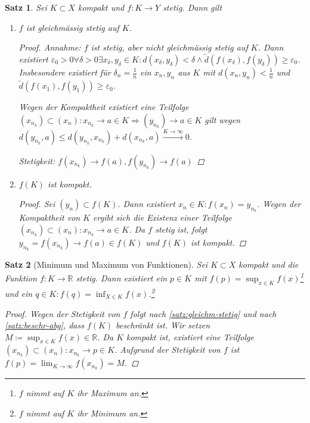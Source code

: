 \documentclass[ngerman,titlepage,twoside, parskip=half*]{scrreprt}
\newcommand*{\R}{\mathbb{R}}
\theoremstyle{break}
\newtheorem{theorem}{Satz}[section]
\theoremstyle{nonumberbreak}
\newtheorem{proof}{Beweis:}
\begin{document}
\begin{theorem}\label{satz:gleichm-stetig}
  Sei $K\subset X$ kompakt und $f\colon K\rightarrow Y$ stetig. Dann gilt
  \begin{enumerate}[(1)]
  \item $f$ ist gleichmässig stetig auf $K$.
    \begin{proof}
      Annahme: $f$ ist stetig, aber nicht gleichmässig stetig auf
      $K$. Dann existiert $\varepsilon_0>0 \forall \delta >0 \exists
      x_{\delta},y_{\delta}\in K\colon d(x_{\delta},
      y_{\delta})<\delta\wedge\tilde{d}(f(x_{\delta}),f(y_{\delta}))\geq
      \varepsilon_0$. Insbesondere existiert für
      $\delta_n=\frac{1}{n}$ ein $x_n,y_n$ aus $K$ mit
      $d(x_n,y_n)<\frac{1}{n}$ und $\tilde{d}(f(x_1),f(y_1))\geq
      \varepsilon_0$.

      Wegen der Kompaktheit existiert eine Teilfolge $(x_{n_k})\subset
      (x_n)\colon x_{n_k}\rightarrow a\in K \Rightarrow
      (y_{n_k})\rightarrow a\in K$ gilt wegen $d(y_{n_k},a)\leq
      d(y_{n_k},x_{n_k})+d(x_{n_k},a)\xrightarrow{K\rightarrow\infty}0$.

      Stetigkeit: $f(x_{n_k})\rightarrow f(a), f(y_{n_k})\rightarrow
      f(a)$\lightning
    \end{proof}
  \item $f(K)$  ist kompakt.
    \begin{proof}
      Sei $(y_n)\subset f(K)$. Dann existiert $x_n \in K\colon
      f(x_n)=y_{n_k}$. Wegen der Kompaktheit von $K$ ergibt sich die
      Existenz einer Teilfolge $(x_{n_k})\subset (x_n)\colon x_{n_k}\rightarrow
    a \in K$. Da $f$ stetig ist, folgt $y_{n_k}=f(x_{n_k})\rightarrow
    f(a) \in f(K)$ und $f(K)$ ist kompakt.
    \end{proof}    
\end{enumerate}
\end{theorem}

\begin{theorem}[Minimum und Maximum von Funktionen]\label{satz:max-fkt}
  Sei $K\subset X$ kompakt und die Funktion $f\colon K\rightarrow\R$ stetig. Dann
  existiert ein $p \in K$ mit $f(p)=\sup_{x\in K}f(x)$\footnote{$f$
    nimmt auf $K$ ihr Maximum an.} und ein $q \in K\colon
  f(q)=\inf_{X\in K}f(x)$.\footnote{$f$ nimmt auf $K$ ihr Minimum an.}
  \begin{proof}
    Wegen der Stetigkeit von $f$ folgt nach
    \autoref{satz:gleichm-stetig} und nach \autoref{satz:beschr-abg}, dass
    $f(K)$ beschränkt ist. Wir setzen $M\coloneqq\sup_{x\in K}
    f(x)\in\R$. Da $K$ kompakt ist, existiert eine Teilfolge
    $(x_{n_k})\subset (x_n)\colon x_{n_k}\rightarrow p\in K$. Aufgrund
    der Stetigkeit von $f$ ist  $f(p)=\lim_{K\rightarrow \infty}
    f(x_{n_{k}})=M$.
  \end{proof}
\end{theorem}
\end{document}
